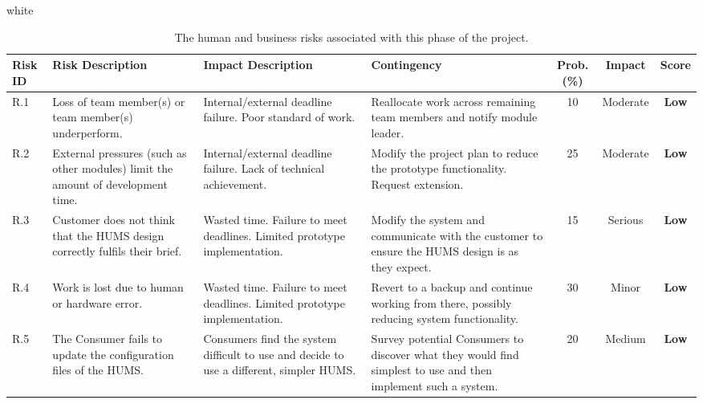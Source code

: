 \documentclass[10pt,a4paper]{article}
\newcommand{\tableformat}[4]{
\begin{table}[ht!]
\centering
  \rowcolors{2}{gray!10} {white}
\def\arraystretch{1.5}
\begin{tabularx}{\textwidth}{#1}
  \hline
  \rowcolor[gray]{0.9} #2
  \hline
\end{tabularx}
\caption{#3}
\label{#4}
\end{table}}
\begin{document}
\tableformat{ p{0.8cm} X X X c c c }
{ 	\hline
  	Risk ID & Risk \newline Description & Impact \newline Description & Contingency & Prob. (\%) & Impact & Score \\
  	\hline
  
    R.1 & Loss of team member(s) or team member(s) underperform. & Internal/external deadline failure. Poor standard of work. & Reallocate work across remaining team members and notify module leader. & 10 & Moderate & \textbf{Low} \\
    R.2 & External pressures (such as other modules) limit the amount of development time. & Internal/external deadline failure. Lack of technical achievement. & Modify the project plan to reduce the prototype functionality. Request extension. & 25 & Moderate &  \textbf{Low} \\
    R.3 & Customer does not think that the HUMS design correctly fulfils their brief. & Wasted time. Failure to meet deadlines. Limited prototype implementation. & Modify the system and communicate with the customer to ensure the HUMS design is as they expect. & 15 & Serious &  \textbf{Low} \\
    R.4 & Work is lost due to human or hardware error. & Wasted time. Failure to meet deadlines. Limited prototype implementation. & Revert to a backup and continue working from there, possibly reducing system functionality. & 30 & Minor &  \textbf{Low} \\
    R.5 & The Consumer fails to update the configuration files of the HUMS. & Consumers find the system difficult to use and decide to use a different, simpler HUMS. & Survey potential Consumers to discover what they would find simplest to use and then implement such a system. & 20 & Medium & \textbf{Low} \\	
}
{The human and business risks associated with this phase of the project.}{tab:human_risks}
\end{document}
